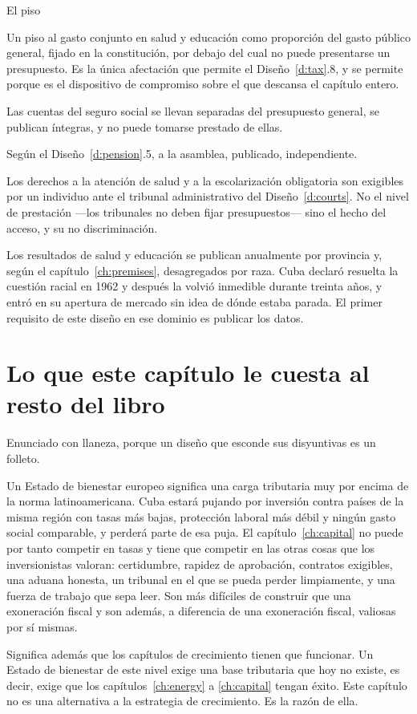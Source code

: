 \begin{design}{El piso}
\label{d:floor}
\begin{rules}
 Un piso al gasto conjunto en salud y educación como
proporción del gasto público general, fijado en la constitución, por debajo del cual no
puede presentarse un presupuesto. Es la única afectación que permite el
Diseño~\ref{d:tax}.8, y se permite porque es el dispositivo de compromiso sobre el que
descansa el capítulo entero.

 Las cuentas del seguro social se llevan separadas del
presupuesto general, se publican íntegras, y no puede tomarse prestado de ellas.

 Según el Diseño~\ref{d:pension}.5, a la asamblea,
publicado, independiente.

 Los derechos a la atención de salud y a la escolarización obligatoria
son exigibles por un individuo ante el tribunal administrativo del
Diseño~\ref{d:courts}. No el nivel de prestación ---los tribunales no deben fijar
presupuestos--- sino el hecho del acceso, y su no discriminación.

 Los resultados de salud y educación se publican anualmente
por provincia y, según el capítulo~\ref{ch:premises}, desagregados por raza. Cuba
declaró resuelta la cuestión racial en 1962 y después la volvió inmedible durante
treinta años, y entró en su apertura de mercado sin idea de dónde estaba parada. El
primer requisito de este diseño en ese dominio es publicar los datos.
\end{rules}
\end{design}

\section{Lo que este capítulo le cuesta al resto del libro}

Enunciado con llaneza, porque un diseño que esconde sus disyuntivas es un folleto.

Un Estado de bienestar europeo significa una carga tributaria muy por encima de la norma
latinoamericana. Cuba estará pujando por inversión contra países de la misma región con
tasas más bajas, protección laboral más débil y ningún gasto social comparable, y perderá
parte de esa puja. El capítulo~\ref{ch:capital} no puede por tanto competir en tasas y
tiene que competir en las otras cosas que los inversionistas valoran: certidumbre,
rapidez de aprobación, contratos exigibles, una aduana honesta, un tribunal en el que se
pueda perder limpiamente, y una fuerza de trabajo que sepa leer. Son más difíciles de
construir que una exoneración fiscal y son además, a diferencia de una exoneración
fiscal, valiosas por sí mismas.

Significa además que los capítulos de crecimiento tienen que funcionar. Un Estado de
bienestar de este nivel exige una base tributaria que hoy no existe, es decir, exige que
los capítulos~\ref{ch:energy} a \ref{ch:capital} tengan éxito. Este capítulo no es una
alternativa a la estrategia de crecimiento. Es la razón de ella.
